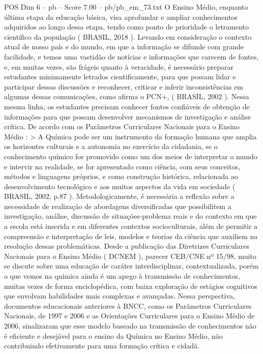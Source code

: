 \begin{textsample}{POS Dim 6 – pb – Score 7.00 – pb/pb\_em\_73.txt}
O Ensino Médio, enquanto última etapa da educação básica, visa aprofundar e ampliar conhecimentos adquiridos ao longo dessa etapa, tendo como ponto de prioridade o letramento científico da população ( BRASIL, 2018 ).
Levando em consideração o contexto atual de nosso país e do mundo, em que a informação se difunde com grande facilidade, e temos uma vastidão de notícias e informações que carecem de fontes, e, em muitas vezes, são frágeis quanto à veracidade, é necessário preparar estudantes minimamente letrados cientificamente, para que possam lidar e participar dessas discussões e reconhecer, criticar e inferir inconsistências em algumas dessas comunicações, como afirma o PCN+, ( BRASIL, 2002 ).
Nessa mesma linha, os estudantes precisam conhecer fontes confiáveis de obtenção de informações para que possam desenvolver mecanismos de investigação e análise crítica.
De acordo com os Parâmetros Curriculares Nacionais para o Ensino Médio : > A Química pode ser um instrumento da formação humana que amplia os horizontes culturais e a autonomia no exercício da cidadania, se o conhecimento químico for promovido como um dos meios de interpretar o mundo e intervir na realidade, se for apresentado como ciência, com seus conceitos, métodos e linguagens próprios, e como construção histórica, relacionada ao desenvolvimento tecnológico e aos muitos aspectos da vida em sociedade ( BRASIL, 2002, p.87 ).
Metodologicamente, é necessária a reflexão sobre a necessidade de realização de abordagens diversificadas que possibilitem a investigação, análise, discussão de situações-problema reais e do contexto em que a escola está inserida e em diferentes contextos socioculturais, além de permitir a compreensão e interpretação de leis, modelos e teorias da ciência que auxiliem na resolução dessas problemáticas.
Desde a publicação das Diretrizes Curriculares Nacionais para o Ensino Médio ( DCNEM ), parecer CEB/CNE nº 15/98, muito se discute sobre uma educação de caráter interdisciplinar, contextualizada, porém o que vemos na química ainda é um apego à transmissão de conhecimentos, muitas vezes de forma enciclopédica, com baixa exploração de estágios cognitivos que envolvam habilidades mais complexas e avançadas.
Nessa perspectiva, documentos educacionais anteriores à BNCC, como os Parâmetros Curriculares Nacionais, de 1997 e 2006 e as Orientações Curriculares para o Ensino Médio de 2006, sinalizaram que esse modelo baseado na transmissão de conhecimentos não é eficiente e desejável para o ensino da Química no Ensino Médio, não contribuindo efetivamente para uma formação crítica e cidadã.

\end{textsample}
